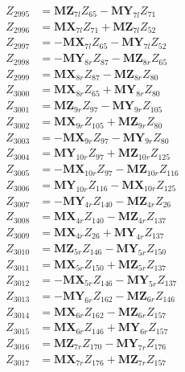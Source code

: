 \begin{multicols}{2}
\begin{align}
Z_{2995} &= \mathbf{MZ}_{7l}Z_{65} - \mathbf{MY}_{7l}Z_{71} \nonumber \\
Z_{2996} &= \mathbf{MX}_{7l}Z_{71} + \mathbf{MZ}_{7l}Z_{52} \nonumber \\
Z_{2997} &= - \mathbf{MX}_{7l}Z_{65} - \mathbf{MY}_{7l}Z_{52} \nonumber \\
Z_{2998} &= - \mathbf{MY}_{8r}Z_{87} - \mathbf{MZ}_{8r}Z_{65} \nonumber \\
Z_{2999} &= \mathbf{MX}_{8r}Z_{87} - \mathbf{MZ}_{8r}Z_{80} \nonumber \\
Z_{3000} &= \mathbf{MX}_{8r}Z_{65} + \mathbf{MY}_{8r}Z_{80} \nonumber \\
Z_{3001} &= \mathbf{MZ}_{9r}Z_{97} - \mathbf{MY}_{9r}Z_{105} \nonumber \\
Z_{3002} &= \mathbf{MX}_{9r}Z_{105} + \mathbf{MZ}_{9r}Z_{80} \nonumber \\
Z_{3003} &= - \mathbf{MX}_{9r}Z_{97} - \mathbf{MY}_{9r}Z_{80} \nonumber \\
Z_{3004} &= \mathbf{MY}_{10r}Z_{97} + \mathbf{MZ}_{10r}Z_{125} \nonumber \\
Z_{3005} &= - \mathbf{MX}_{10r}Z_{97} - \mathbf{MZ}_{10r}Z_{116} \nonumber \\
Z_{3006} &= \mathbf{MY}_{10r}Z_{116} - \mathbf{MX}_{10r}Z_{125} \nonumber \\
Z_{3007} &= - \mathbf{MY}_{4r}Z_{140} - \mathbf{MZ}_{4r}Z_{26} \nonumber \\
Z_{3008} &= \mathbf{MX}_{4r}Z_{140} - \mathbf{MZ}_{4r}Z_{137} \nonumber \\
Z_{3009} &= \mathbf{MX}_{4r}Z_{26} + \mathbf{MY}_{4r}Z_{137} \nonumber \\
Z_{3010} &= \mathbf{MZ}_{5r}Z_{146} - \mathbf{MY}_{5r}Z_{150} \nonumber \\
Z_{3011} &= \mathbf{MX}_{5r}Z_{150} + \mathbf{MZ}_{5r}Z_{137} \nonumber \\
Z_{3012} &= - \mathbf{MX}_{5r}Z_{146} - \mathbf{MY}_{5r}Z_{137} \nonumber \\
Z_{3013} &= - \mathbf{MY}_{6r}Z_{162} - \mathbf{MZ}_{6r}Z_{146} \nonumber \\
Z_{3014} &= \mathbf{MX}_{6r}Z_{162} - \mathbf{MZ}_{6r}Z_{157} \nonumber \\
Z_{3015} &= \mathbf{MX}_{6r}Z_{146} + \mathbf{MY}_{6r}Z_{157} \nonumber \\
Z_{3016} &= \mathbf{MZ}_{7r}Z_{170} - \mathbf{MY}_{7r}Z_{176} \nonumber \\
Z_{3017} &= \mathbf{MX}_{7r}Z_{176} + \mathbf{MZ}_{7r}Z_{157} \nonumber \\

\end{align}
\end{multicols}
